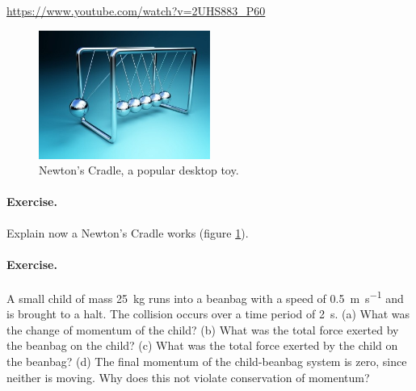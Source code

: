 \documentclass[a4paper]{amsbook}
\newcommand\capcite[1]{}
\begin{document}
\begin{center}
\begin{tcolorbox}[width=0.8\textwidth,colback={red},title={\textbf{Go and watch...}},colbacktitle=yellow,coltitle=blue]
  \textcolor{white}{\url{https://www.youtube.com/watch?v=2UHS883_P60}}
\end{tcolorbox}
\end{center}

\begin{figure}
  \centering
  \includegraphics[width=0.5\textwidth]{newtoncradle}
  \caption{Newton's Cradle, a popular desktop toy. \capcite{http://images.tutorvista.com/cms/images/95/conservation-of-momentum-experiment1.jpg}\label{fig:babynewton}}
\end{figure}

\paragraph{Exercise.} Explain now a Newton's Cradle works (figure \ref{fig:babynewton}).

\paragraph{Exercise.} A small child of mass \SI{25}{\kilo\gram} runs into a beanbag with a speed of \SI{0.5}{\metre\per\second} and is brought to a
halt. The collision occurs over a time period of \SI{2}{\second}. (a) What was the change of momentum of the child? (b) What was the total force
exerted by the beanbag on the child? (c) What was the total force exerted by the child on the beanbag? (d) The final momentum of the child-beanbag
system is zero, since neither is moving. Why does this not violate conservation of momentum?
\end{document}
